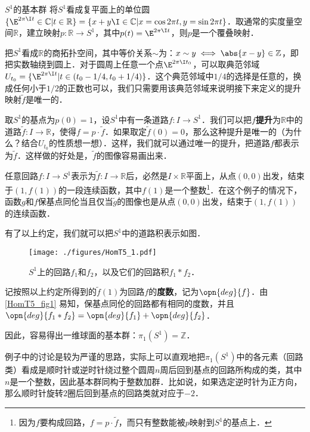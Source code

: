 \begin{example}{$S^1$的基本群}\label{HomT5_ex2}
将$S^1$看成复平面上的单位圆$\{\E^{2\pi\I t}\in\mathbb{C}|t\in\mathbb{R}\}=\{x+y\I\in\mathbb{C}|x=\cos{2\pi t}, y=\sin{2\pi t}\}$．取通常的实度量空间$\mathbb{R}$，建立映射$p:\mathbb{R}\rightarrow S^1$，其中$p(t)=\E^{2\pi\I t}$，则$p$是一个覆叠映射．

把$S^1$看成$\mathbb{R}$的商拓扑空间，其中等价关系$\sim$为：$x\sim y\iff \abs{x-y}\in\mathbb{Z}$，即把实数轴绕到圆上．对于圆周上任意一个点$\E^{2\pi\I t_0}$，可以取典范邻域$U_{t_0}=\{\E^{2\pi\I t}|t\in(t_0-1/4, t_0+1/4)\}$．这个典范邻域中$1/4$的选择是任意的，换成任何小于$1/2$的正数也可以，我们只需要用该典范邻域来说明接下来定义的提升映射$\tilde{f}$是唯一的．

取$S^1$的基点为$p(0)=1$，设$S^1$中有一条道路$f:I\rightarrow S^1$．我们可以把$f$\textbf{提升}为$\mathbb{R}$中的道路$\tilde{f}:I\rightarrow\mathbb{R}$，使得$f=p\cdot\tilde{f}$．如果取定$\tilde{f}(0)=0$，那么这种提升是唯一的（为什么？结合$U_{t_0}$的性质想一想）．这样，我们就可以通过唯一的提升，把道路$f$都表示为$\tilde{f}$．这样做的好处是，$\tilde{f}$的图像容易画出来．

任意回路$f:I\rightarrow S^1$表示为$\tilde{f}:I\rightarrow\mathbb{R}$后，必然是$I\times\mathbb{R}$平面上，从点$(0, 0)$出发，结束于$(1, f(1))$的一段连续函数，其中$f(1)$是一个整数\footnote{因为$f$要构成回路，$f=p\cdot\tilde{f}$，而只有整数能被$p$映射到$S^1$的基点上．}．在这个例子的情况下，函数$g$和$f$保基点同伦当且仅当$\tilde{g}$的图像也是从点$(0, 0)$出发，结束于$(1, f(1))$的连续函数．

有了以上约定，我们就可以把$S^1$中的道路积表示如图．

\begin{figure}[ht]
\centering
\texttt{[image: ./figures/HomT5\_1.pdf]}
\caption{$S^1$上的回路$f_1$和$f_2$，以及它们的回路积$f_1*f_2$．} \label{HomT5_fig1}
\end{figure}

记按照以上约定所得到的$\tilde{f}(1)$为回路$f$的\textbf{度数}，记为$\opn{deg}{f}$．由\autoref{HomT5_fig1} 易知，保基点同伦的回路都有相同的度数，并且$\opn{deg}{f_1*f_2}=\opn{deg}{f_1}+\opn{deg}{f_2}$．

因此，容易得出一维球面的基本群：$\pi_1(S^1)=\mathbb{Z}$．


\end{example}

例子中的讨论是较为严谨的思路，实际上可以直观地把$\pi_1(S^1)$中的各元素（回路类）看成是顺时针或逆时针绕过整个圆周$n$周后回到基点的回路所构成的类，其中$n$是一个整数，因此基本群同构于整数加群．比如说，如果选定逆时针为正方向，那么顺时针旋转$2$圈后回到基点的回路类就对应于$-2$．


